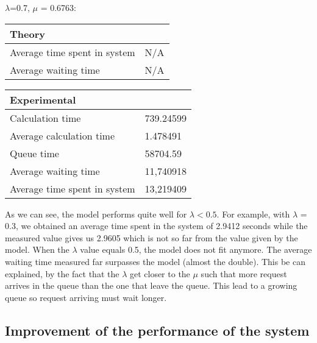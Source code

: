 \begin{minipage}{\linewidth}
   $\lambda$=0.7, $\mu$ = 0.6763:

    \bigskip
    \begin{minipage}{0.45\linewidth}
        \begin{tabular}{|l|l|}
            \hline
            Theory & \\
            \hline
            Average time spent in system & N/A \\
            Average waiting time & N/A \\
            \hline
        \end{tabular}
    \end{minipage}
    \begin{minipage}{0.45\linewidth}
        \begin{tabular}{|l|l|}
            \hline
            Experimental & \\
            \hline
            Calculation time & 739.24599 \\
            Average calculation time & 1.478491 \\
            Queue time & 58704.59 \\
            Average waiting time & 11,740918 \\
            Average time spent in system & 13,219409 \\
            \hline
        \end{tabular}
    \end{minipage}
    \bigskip
\end{minipage}

As we can see, the model performs quite well for $\lambda < 0.5$. For example, with $\lambda$ = 0.3, we obtained an average time spent in the system of 2.9412 seconds while the measured value gives us 2.9605 which is not so far from the value given by the model. When the $\lambda$ value equals 0.5, the model does not fit anymore. The average waiting time measured far surpasses the model (almost the double). This be can explained, by the fact that the $\lambda$ get closer to the $\mu$ such that more request arrives in the queue than the one that leave the queue. This lead to a growing queue so request arriving must wait longer.

\subsection{Improvement of the performance of the system}
\label{sub:Improvement of the performance of the system}

